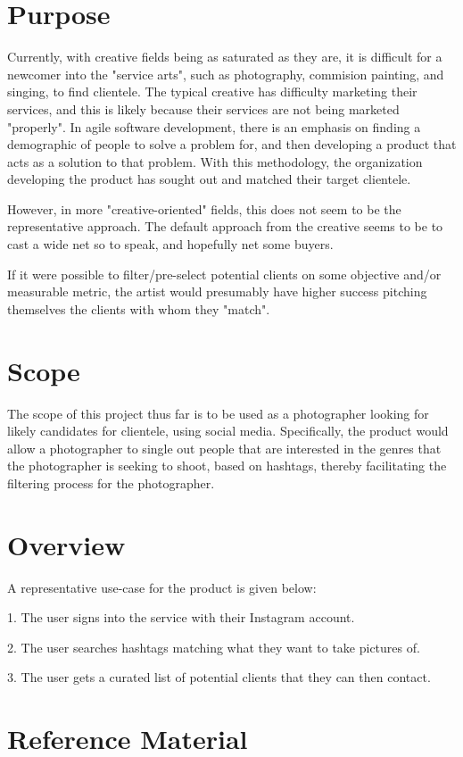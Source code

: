 \section{Purpose}
Currently, with creative fields being as saturated as they are, 
it is difficult for a newcomer into the "service arts", such as photography, commision painting, and singing,
to find clientele. The typical creative has difficulty marketing their services, and this is likely because 
their services are not being marketed "properly". In agile software development, there is an emphasis on 
finding a demographic of people to solve a problem for, and then developing a product that acts as a solution
to that problem. With this methodology, the organization developing the product has sought out and matched their target clientele.

However, in more "creative-oriented" fields, this does not seem to be the representative approach. The default approach from the 
creative seems to be to cast a wide net so to speak, and hopefully net some buyers.

If it were possible to filter/pre-select potential clients on some objective and/or measurable metric, the artist 
would presumably have higher success pitching themselves the clients with whom they "match".

\section{Scope}
The scope of this project thus far is to be used as a photographer looking for likely candidates for clientele,
using social media. Specifically, the product would allow a photographer to single out people that are interested in the genres that the 
photographer is seeking to shoot, based on hashtags, thereby facilitating the filtering process for the photographer.

\section{Overview}
A representative use-case for the product is given below:

1. The user signs into the service with their Instagram account.

2. The user searches hashtags matching what they want to take pictures of.

3. The user gets a curated list of potential clients that they can then contact.

\section{Reference Material}

